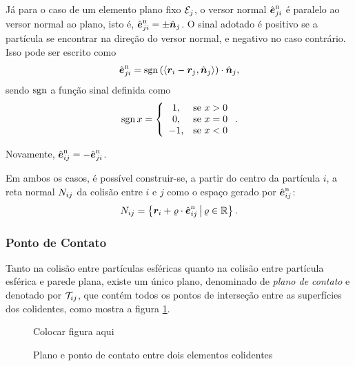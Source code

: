 Já para o caso de um elemento plano fixo \({\mathcal{E}}_{j}\), o versor normal \({\hat{\bm{e}}}_{j i}^{\text{n}}\) é paralelo ao versor normal ao plano, isto é, \({\hat{\bm{e}}}_{j i}^{\text{n}} = \pm {\hat{\bm{n}}}_{j}\). O sinal adotado é positivo se a partícula se encontrar na direção do versor normal, e negativo no caso contrário. Isso pode ser escrito como
\begin{equation*}
	\normalVersorji = \sign\pqty{\innerProduct{\positioni - \planeOriginj}{\planeNormalVersorj}}\cdot\planeNormalVersorj,
\end{equation*}
sendo \(\operatorname{sgn}\) a função sinal definida como
\begin{equation*}
	\operatorname{sgn} x =
	\left\lbrace
	\begin{array}{cl}
		1, & \text{se } x > 0 \\
		0, & \text{se } x = 0 \\
		-1, & \text{se } x < 0
	\end{array}
	\right.
	.
\end{equation*}

Novamente, \({\hat{\bm{e}}}_{i j}^{\text{n}} = - {\hat{\bm{e}}}_{j i}^{\text{n}}\).

Em ambos os casos, é possível construir-se, a partir do centro da partícula \(i\), a reta normal \({N}_{i j}\) da colisão entre \(i\) e \(j\) como o espaço gerado por \({\hat{\bm{e}}}_{i j}^{\text{n}}\):
\begin{equation*}
	{N}_{i j} = \left\lbrace {\bm{r}}_{i} + \varrho\cdot{\hat{\bm{e}}}_{i j}^{\text{n}}\,\middle|\,\varrho\in\mathbb{R} \right\rbrace.
\end{equation*}

\subsubsection*{Ponto de Contato}

Tanto na colisão entre partículas esféricas quanto na colisão entre partícula esférica e parede plana, existe um único plano, denominado de \textit{plano de contato} e denotado por \({\mathcal{T}}_{i j}\), que contém todos os pontos de interseção entre as superfícies dos colidentes, como mostra a figura \ref{fig:contact_point}.

\begin{figure}[h]
	\caption{Plano e ponto de contato entre dois elementos colidentes}
	\centering
		\alert{Colocar figura aqui}
	\label{fig:contact_point}
\end{figure}

